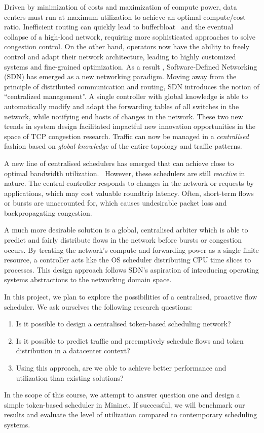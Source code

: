 Driven by minimization of costs and maximization of compute power, data centers must  run at maximum utilization to achieve an optimal compute/cost ratio. Inefficient routing can quickly lead to bufferbloat~\cite{bufferbloat} and the eventual collapse of a high-load network, requiring more sophisticated approaches to solve congestion control. 
On the other hand, operators now have the ability to freely control and adapt their network architecture, leading to highly customized systems and fine-grained optimization. As a result , Software-Defined Networking (SDN) has emerged as a new networking paradigm. Moving away from the principle of distributed communication and routing, SDN introduces the notion of “centralized management”. A single controller with global knowledge is able to automatically modify and adapt the forwarding tables of all switches in the network, while notifying end hosts of changes in the network.
These two new trends in system design facilitated impactful new innovation opportunities in the space of TCP congestion research. Traffic can now be managed in a  \textit{centralised} fashion based on \textit{global knowledge} of the entire topology and traffic patterns.

A new line of centralised schedulers has emerged that  can achieve close to optimal bandwidth utilization.~\cite{hedera, fastpass, microte, b4, dionysus}
However, these schedulers are still  \textit{reactive}  in nature. The central controller responds to changes in the network or requests by applications, which may cost valuable roundtrip latency. Often, short-term flows or bursts are unaccounted for, which causes undesirable packet loss and backpropagating congestion. 

A much more desirable solution is a global, centralised arbiter which is able to predict and fairly distribute flows in the network before bursts or congestion occurs. By treating the network’s compute and forwarding power as a single finite resource, a controller acts like the OS scheduler distributing CPU time slices to processes. This design approach follows SDN’s aspiration of introducing operating systems abstractions to the networking domain space.

In this project, we plan to explore the possibilities of a centralised, proactive flow scheduler. We ask ourselves the following research questions:
\begin{enumerate}
\item Is it possible to design a centralised token-based scheduling network?
\item Is it possible to predict traffic and preemptively schedule flows and token distribution in a datacenter context?
\item Using this approach, are we able to achieve better performance and utilization than existing solutions?
\end{enumerate}

In the scope of this course, we attempt to answer question one and design a simple token-based scheduler in Mininet. If successful, we will benchmark our results and evaluate the level of utilization compared to contemporary scheduling systems.
